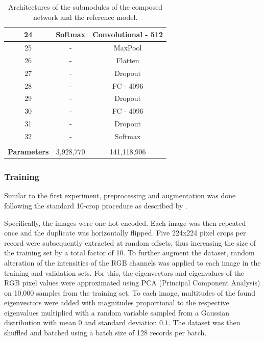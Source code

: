 \begin{table}
\begin{tabular}{|c|c|c|}
        \hline
        24 & Softmax & Convolutional - 512 \\
        \hline
        25 & - & MaxPool \\
        \hline
        26 & - & Flatten \\
        \hline
        27 & - & Dropout \\
        \hline
        28 & - & FC - 4096 \\
        \hline
        29 & - & Dropout \\
        \hline
        30 & - & FC - 4096 \\
        \hline
        31 & - & Dropout \\
        \hline
        32 & - & Softmax \\
        \hline
        \multicolumn{3}{c}{} \\[-2ex]
        \hline
        \textbf{Parameters} & 3,928,770 & 141,118,906 \\
        \hline
    \end{tabular}
    \caption{Architectures of the submodules of the composed network and the reference model.}
    \label{tab:experiments_imagenet_models_structure}
\end{table}
               
\subsubsection{Training%
               \label{sec:experiments_imagenet_training}}
               
Similar to the first experiment, preprocessing and augmentation was done following the standard 10-crop procedure as described by \cite{Krizhevsky2012-jr}.

Specifically, the images were one-hot encoded. Each image was then repeated once and the duplicate was horizontally flipped. Five 224x224 pixel crops per record were subsequently extracted at random offsets, thus increasing the size of the training set by a total factor of 10. To further augment the dataset, random alteration of the intensities of the RGB channels was applied to each image in the training and validation sets. For this, the eigenvectors and eigenvalues of the RGB pixel values were approximated using PCA (Principal Component Analysis) on 10,000 samples from the training set. To each image, multitudes of the found eigenvectors were added with magnitudes proportional to the respective eigenvalues multiplied with a random variable sampled from a Gaussian distribution with mean $0$ and standard deviation $0.1$. The dataset was then shuffled and batched using a batch size of 128 records per batch.

